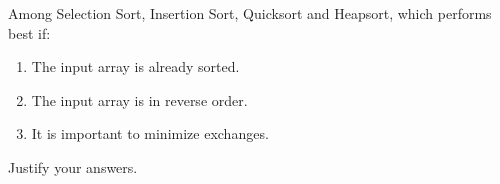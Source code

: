 Among Selection Sort, Insertion Sort, Quicksort and Heapsort,
which performs best if:

  \begin{enumerate}
 
  \item  The input array is already sorted.

  \item  The input array is in reverse order.
 
  \item  It is important to minimize exchanges.

  \end{enumerate}

Justify your answers.
